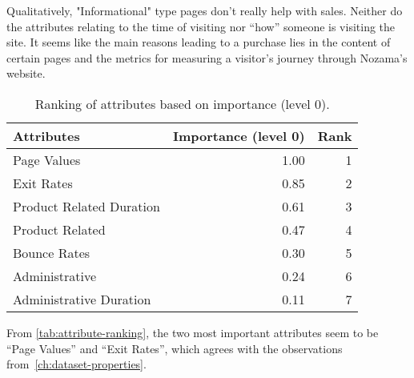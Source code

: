\documentclass[../cmpe-251-project-report.tex]{subfiles}
\begin{document}
  Qualitatively, "Informational" type pages don't really help with sales. Neither do the attributes relating to the time of visiting nor ``how'' someone is visiting the site. It seems like the main reasons leading to a purchase lies in the content of certain pages and the metrics for measuring a visitor's journey through Nozama's website.
  \begin{table}
    \caption{Ranking of attributes based on importance (level 0).}
    \label{tab:attribute-ranking}
    \begin{tabular}{lrr}
      \toprule
      Attributes               & Importance (level 0) & Rank \\
      \midrule
      Page Values              & 1.00                 & 1    \\
      Exit Rates               & 0.85                 & 2    \\
      Product Related Duration & 0.61                 & 3    \\
      Product Related          & 0.47                 & 4    \\
      Bounce Rates             & 0.30                 & 5    \\
      Administrative           & 0.24                 & 6    \\
      Administrative Duration  & 0.11                 & 7    \\
      \bottomrule
    \end{tabular}
  \end{table}
  From \autoref{tab:attribute-ranking}, the two most important attributes seem to be ``Page Values'' and ``Exit Rates'', which agrees with the observations from~\autoref{ch:dataset-properties}.
\end{document}
